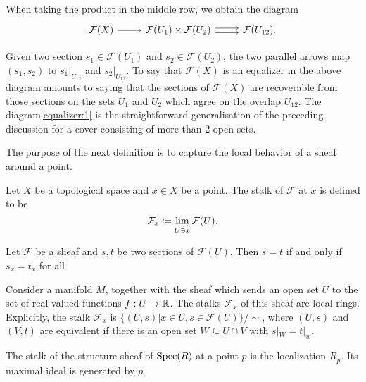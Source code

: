 When taking the product in the middle row, we obtain the diagram 
\[\begin{tikzcd}
	{\mathcal{F}(X)} & {\mathcal{F}(U_1)\times\mathcal{F}(U_2)} & {\mathcal{F}(U_{12})}.
	\arrow[from=1-1, to=1-2]
	\arrow[shift right=1, from=1-2, to=1-3]
	\arrow[shift left=1, from=1-2, to=1-3]
\end{tikzcd}\]

Given two section $s_1 \in \mathcal{F}(U_1)$ and $s_2 \in \mathcal{F}(U_2)$, the two parallel arrows map $(s_1, s_2)$ to $s_1|_{U_{12}}$ and $s_2|_{U_{12}}$. To say that $\mathcal{F}(X)$ is an equalizer in the above diagram amounts to saying that the sections of $\mathcal{F}(X)$ are recoverable from those sections on the sets $U_1$ and $U_2$ which agree on the overlap $U_{12}$. The diagram\eqref{equalizer:1} is the straightforward generalisation of the preceding discussion for a cover consisting of more than 2 open sets.




The purpose of the next definition is to capture the local behavior of a sheaf around a point.
\begin{definition}
  Let $X$ be a topological space and  $x \in X$ be a point. The stalk of $\mathcal{F}$ at $x$ is defined to be \[ \mathcal{F}_x \coloneqq \colim_{U \ni x}\mathcal{F}(U).\]
\end{definition}
\begin{proposition}
	Let $\mathcal{F}$ be a sheaf and $s,t$ be two sections of $\mathcal{F}(U)$. Then $s = t$ if and only if $s_x = t_x$ for all
\end{proposition}

\begin{example}
  Consider a manifold $M$, together with the sheaf which sends an open set $U$ to the set of real valued functions $f: U \to \mathbb{R}$. The stalks $\mathcal{F}_x$ of this sheaf are local rings. Explicitly, the stalk $\mathcal{F}_x$ is  $\{ (U,s) | x \in U,  s \in \mathcal{F}(U) \}/\sim$, where $(U,s)$ and $(V, t)$ are equivalent if there is an open set $W \subseteq U \cap V$ with $s|_W = t|_w$.

\end{example}

\begin{example}
  The stalk of the structure sheaf of $\operatorname{Spec}(R)$ at a point $p$ is the localization $R_p$. Its maximal ideal is generated by $p$.
\end{example}


